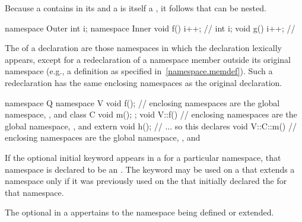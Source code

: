 \pnum
Because a  contains
 in its  and a
 is itself a , it
follows that  can be nested.
\begin{example}
\begin{codeblock}
namespace Outer {
  int i;
  namespace Inner {
    void f() { i++; }           // 
    int i;
    void g() { i++; }           // 
  }
}
\end{codeblock}
\end{example}

\pnum
The  of a declaration are those
namespaces in which the declaration lexically appears, except for a
redeclaration of a namespace member outside its original namespace
(e.g., a definition as specified in~\ref{namespace.memdef}). Such a
redeclaration has the same enclosing namespaces as the original
declaration.
\begin{example}
\begin{codeblock}
namespace Q {
  namespace V {
    void f();                   // enclosing namespaces are the global namespace, , and 
    class C { void m(); };
  }
  void V::f() {                 // enclosing namespaces are the global namespace, , and 
    extern void h();            // ... so this declares 
  }
  void V::C::m() {              // enclosing namespaces are the global namespace, , and 
  }
}
\end{codeblock}
\end{example}

\pnum
If the optional initial  keyword appears in a
 for a particular namespace, that namespace is
declared to be an . The  keyword may be
used on a  that extends a namespace
only if it was previously used on the 
that initially declared the  for that namespace.

\pnum
The optional 
in a 
appertains to the namespace being defined or extended.


